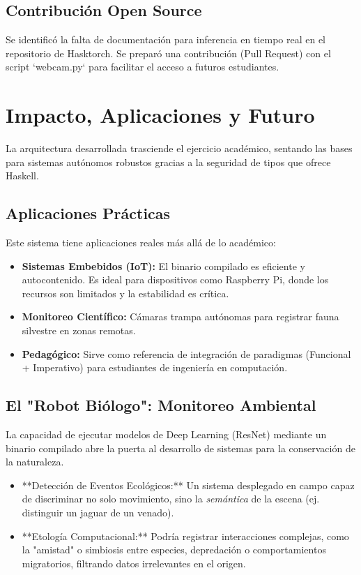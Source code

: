 \documentclass[12pt, letterpaper]{article}
\begin{document}
\subsection{Contribución Open Source}
Se identificó la falta de documentación para inferencia en tiempo real en el repositorio de Hasktorch. Se preparó una contribución (Pull Request) con el script `webcam.py` para facilitar el acceso a futuros estudiantes.

\section{Impacto, Aplicaciones y Futuro}

La arquitectura desarrollada trasciende el ejercicio académico, sentando las bases para sistemas autónomos robustos gracias a la seguridad de tipos que ofrece Haskell.

\subsection{Aplicaciones Prácticas}
Este sistema tiene aplicaciones reales más allá de lo académico:

\begin{itemize}
    \item \textbf{Sistemas Embebidos (IoT):} El binario compilado es eficiente y autocontenido. Es ideal para dispositivos como Raspberry Pi, donde los recursos son limitados y la estabilidad es crítica.
    \item \textbf{Monitoreo Científico:} Cámaras trampa autónomas para registrar fauna silvestre en zonas remotas.
    \item \textbf{Pedagógico:} Sirve como referencia de integración de paradigmas (Funcional + Imperativo) para estudiantes de ingeniería en computación.
\end{itemize}

\subsection{El "Robot Biólogo": Monitoreo Ambiental}
La capacidad de ejecutar modelos de Deep Learning (ResNet) mediante un binario compilado abre la puerta al desarrollo de sistemas para la conservación de la naturaleza.
\begin{itemize}
    \item **Detección de Eventos Ecológicos:** Un sistema desplegado en campo capaz de discriminar no solo movimiento, sino la \textit{semántica} de la escena (ej. distinguir un jaguar de un venado).
    \item **Etología Computacional:** Podría registrar interacciones complejas, como la "amistad" o simbiosis entre especies, depredación o comportamientos migratorios, filtrando datos irrelevantes en el origen.
\end{itemize}
\end{document}
